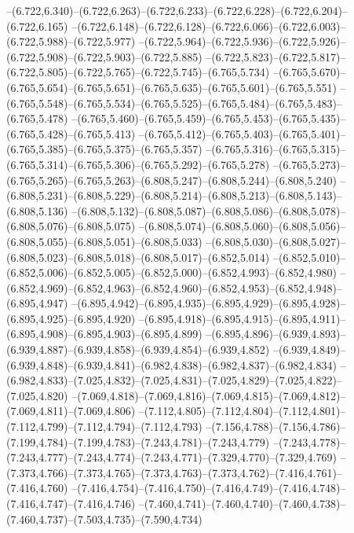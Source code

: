   --(6.722,6.340)--(6.722,6.263)--(6.722,6.233)--(6.722,6.228)--(6.722,6.204)--(6.722,6.165)%
  --(6.722,6.148)--(6.722,6.128)--(6.722,6.066)--(6.722,6.003)--(6.722,5.988)--(6.722,5.977)%
  --(6.722,5.964)--(6.722,5.936)--(6.722,5.926)--(6.722,5.908)--(6.722,5.903)--(6.722,5.885)%
  --(6.722,5.823)--(6.722,5.817)--(6.722,5.805)--(6.722,5.765)--(6.722,5.745)--(6.765,5.734)%
  --(6.765,5.670)--(6.765,5.654)--(6.765,5.651)--(6.765,5.635)--(6.765,5.601)--(6.765,5.551)%
  --(6.765,5.548)--(6.765,5.534)--(6.765,5.525)--(6.765,5.484)--(6.765,5.483)--(6.765,5.478)%
  --(6.765,5.460)--(6.765,5.459)--(6.765,5.453)--(6.765,5.435)--(6.765,5.428)--(6.765,5.413)%
  --(6.765,5.412)--(6.765,5.403)--(6.765,5.401)--(6.765,5.385)--(6.765,5.375)--(6.765,5.357)%
  --(6.765,5.316)--(6.765,5.315)--(6.765,5.314)--(6.765,5.306)--(6.765,5.292)--(6.765,5.278)%
  --(6.765,5.273)--(6.765,5.265)--(6.765,5.263)--(6.808,5.247)--(6.808,5.244)--(6.808,5.240)%
  --(6.808,5.231)--(6.808,5.229)--(6.808,5.214)--(6.808,5.213)--(6.808,5.143)--(6.808,5.136)%
  --(6.808,5.132)--(6.808,5.087)--(6.808,5.086)--(6.808,5.078)--(6.808,5.076)--(6.808,5.075)%
  --(6.808,5.074)--(6.808,5.060)--(6.808,5.056)--(6.808,5.055)--(6.808,5.051)--(6.808,5.033)%
  --(6.808,5.030)--(6.808,5.027)--(6.808,5.023)--(6.808,5.018)--(6.808,5.017)--(6.852,5.014)%
  --(6.852,5.010)--(6.852,5.006)--(6.852,5.005)--(6.852,5.000)--(6.852,4.993)--(6.852,4.980)%
  --(6.852,4.969)--(6.852,4.963)--(6.852,4.960)--(6.852,4.953)--(6.852,4.948)--(6.895,4.947)%
  --(6.895,4.942)--(6.895,4.935)--(6.895,4.929)--(6.895,4.928)--(6.895,4.925)--(6.895,4.920)%
  --(6.895,4.918)--(6.895,4.915)--(6.895,4.911)--(6.895,4.908)--(6.895,4.903)--(6.895,4.899)%
  --(6.895,4.896)--(6.939,4.893)--(6.939,4.887)--(6.939,4.858)--(6.939,4.854)--(6.939,4.852)%
  --(6.939,4.849)--(6.939,4.848)--(6.939,4.841)--(6.982,4.838)--(6.982,4.837)--(6.982,4.834)%
  --(6.982,4.833)--(7.025,4.832)--(7.025,4.831)--(7.025,4.829)--(7.025,4.822)--(7.025,4.820)%
  --(7.069,4.818)--(7.069,4.816)--(7.069,4.815)--(7.069,4.812)--(7.069,4.811)--(7.069,4.806)%
  --(7.112,4.805)--(7.112,4.804)--(7.112,4.801)--(7.112,4.799)--(7.112,4.794)--(7.112,4.793)%
  --(7.156,4.788)--(7.156,4.786)--(7.199,4.784)--(7.199,4.783)--(7.243,4.781)--(7.243,4.779)%
  --(7.243,4.778)--(7.243,4.777)--(7.243,4.774)--(7.243,4.771)--(7.329,4.770)--(7.329,4.769)%
  --(7.373,4.766)--(7.373,4.765)--(7.373,4.763)--(7.373,4.762)--(7.416,4.761)--(7.416,4.760)%
  --(7.416,4.754)--(7.416,4.750)--(7.416,4.749)--(7.416,4.748)--(7.416,4.747)--(7.416,4.746)%
  --(7.460,4.741)--(7.460,4.740)--(7.460,4.738)--(7.460,4.737)--(7.503,4.735)--(7.590,4.734)%
